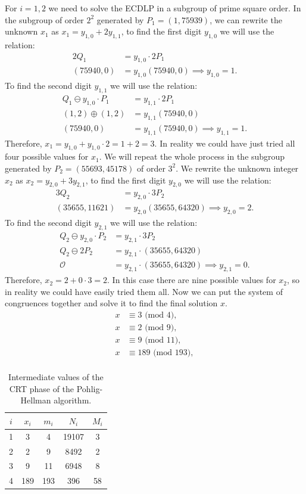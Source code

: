 \documentclass[thesis=M,english]{FITthesis}[2012/10/20]
\theoremstyle{remark}
\theoremstyle{definition}
\begin{document}
For $i=1,2$ we need to solve the ECDLP in a subgroup of prime square order. In the subgroup of order $2^2$ generated by $P_1 = (1, 75939)$, we can rewrite the unknown $x_1$ as $x_1 = y_{1,0} + 2y_{1,1}$, to find the first digit $y_{1,0}$ we will use the relation:
\begin{align*}
2Q_1 &= y_{1,0}\cdot2P_1 \\
(75940, 0) &= y_{1,0}(75940, 0) \implies y_{1,0} = 1.
\end{align*}
To find the second digit $y_{1,1}$ we will use the relation:
\begin{align*}
Q_1 \ominus y_{1,0}\cdot P_1 &= y_{1,1}\cdot 2P_1 \\
(1,2) \oplus (1,2) & = y_{1,1}(75940, 0) \\
(75940, 0) &= y_{1,1}(75940, 0) \implies y_{1,1} = 1.
\end{align*}
Therefore, $x_1 = y_{1,0} + y_{1,0}\cdot 2 = 1 + 2 = 3.$ In reality we could have just tried all four possible values for $x_1$. We will repeat the whole process in the subgroup generated by $P_2 = (55693, 45178)$ of order $3^2$. We rewrite the unknown integer $x_2$ as $x_2 = y_{2,0} + 3y_{2,1}$, to find the first digit $y_{2,0}$ we will use the relation:
\begin{align*}
3Q_2 &= y_{2,0}\cdot 3P_2 \\
(35655, 11621) &= y_{2,0}(35655, 64320) \implies y_{2,0} = 2.
\end{align*}
To find the second digit $y_{2,1}$ we will use the relation:
\begin{align*}
Q_2 \ominus y_{2,0}\cdot P_2 &= y_{2,1}\cdot 3P_2 \\
Q_2 \ominus 2P_2 &= y_{2,1}\cdot (35655, 64320) \\
\mathcal{O} &= y_{2,1}\cdot (35655, 64320) \implies y_{2,1} = 0.
\end{align*}
Therefore, $x_2 = 2 + 0\cdot 3 = 2$. In this case there are nine possible values for $x_2$, so in reality we could have easily tried them all. Now we can put the system of congruences together and solve it to find the final solution $x$.
\begin{align*}
x &\equiv 3 \text{ (mod $4$)}, \\
x &\equiv 2 \text{ (mod $9$)}, \\
x &\equiv 9 \text{ (mod $11$)}, \\
x &\equiv 189 \text{ (mod $193$)}, \\
\end{align*}
\begin{table}[!h]
\centering
\begin{tabular}{ |c||c|c|c|c| } 
\hline
 $i$ & $x_i$ & $m_i$ & $N_i$ & $M_i$ \\
\hline
\hline
1 & 3 & 4 & 19107 &  3 \\ \hline
2 & 2 & 9 & 8492 & 2\\ \hline \hline
3 & 9 & 11 & 6948 & 8 \\ \hline
4 & 189 &193 & 396 & 58 \\ \hline
\end{tabular}
\caption{Intermediate values of the CRT phase of the Pohlig-Hellman algorithm.}
\label{tblPH3}
\end{table}
\end{document}
